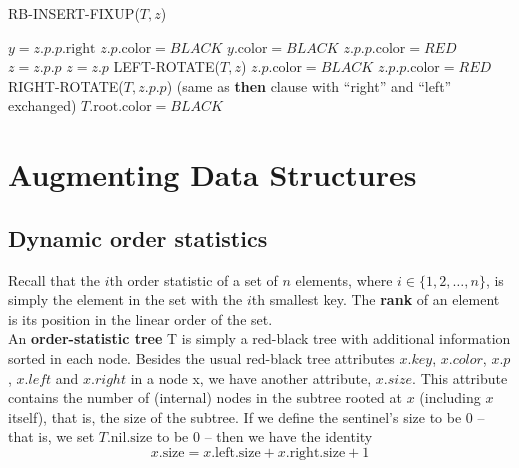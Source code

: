 \documentclass[12pt]{article}
\begin{document}
RB-INSERT-FIXUP($T,z$)
\begin{algorithmic}[1]
        	\State $y = z.p.p.\text{right}$
                	\State $z.p.\text{color} = BLACK$
                        \State $y.\text{color} = BLACK$
                        \State $z.p.p.\text{color} = RED$
                        \State $z = z.p.p$
                \Else
                		\State $z = z.p$
                        	\State LEFT-ROTATE($T,z$)
                        \EndIf
                        \State $z.p.\text{color} = BLACK$
                        \State $z.p.p.\text{color} = RED$
                        \State RIGHT-ROTATE($T,z.p.p$)
                \EndIf
        \Else
        	\State (same as \textbf {then} clause with ``right'' and ``left'' exchanged)
        \EndIf
\EndWhile
\State $T.\text{root}.\text{color} = BLACK$
\end{algorithmic}

\section{Augmenting Data Structures}

\subsection{Dynamic order statistics}

Recall that the $i$th order statistic of a set of $n$ elements, where $i \in \{ 1,2,\dots,n \}$, is simply the element in the set with the $i$th smallest key. The \textbf{rank} of an element is its position in the linear order of the set. \\

An \textbf{order-statistic tree} T is simply a red-black tree with additional information sorted in each node. Besides the usual red-black tree attributes $x.key$, $x.color$, $x.p$, $x.left$ and $x.right$ in a node x, we have another attribute, $x.size$. This attribute contains the number of (internal) nodes in the subtree rooted at $x$ (including $x$ itself), that is, the size of the subtree. If we define the sentinel's size to be 0 -- that is, we set $T.\text{nil}.\text{size}$ to be 0 -- then we have the identity
\begin{equation*}
  x.\text{size} = x.\text{left}.\text{size} + x.\text{right}.\text{size} + 1
\end{equation*}
\end{document}
